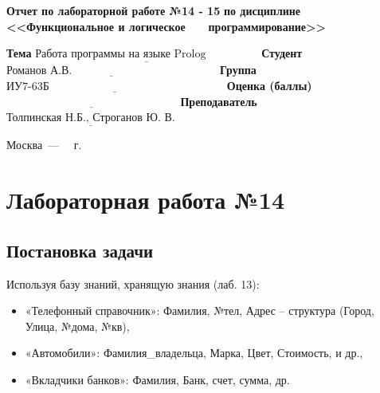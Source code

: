 \documentclass[12pt]{report}
\begin{document}
\begin{titlepage}
		\begin{center}
			\noindent\begin{minipage}{1.1\textwidth}\centering
				\Large\textbf{  Отчет по лабораторной работе №14 - 15}\newline
				\textbf{по дисциплине <<Функциональное и логическое}\newline
				\textbf{~~~программирование>>}\newline\newline
			\end{minipage}
		\end{center}
		
		\noindent\textbf{Тема} $\underline{\text{Работа программы на языке Prolog~~~~~~~~~~~~~~}}$\newline\newline
		\noindent\textbf{Студент} $\underline{\text{Романов А.В.~~~~~~~~~~~~~~~~~~~~~~~~~~~~~~~~~~~~~~~}}$\newline\newline
		\noindent\textbf{Группа} $\underline{\text{ИУ7-63Б~~~~~~~~~~~~~~~~~~~~~~~~~~~~~~~~~~~~~~~~~~~~~~~}}$\newline\newline
		\noindent\textbf{Оценка (баллы)} $\underline{\text{~~~~~~~~~~~~~~~~~~~~~~~~~~~~~~~~~~~~~~~~~~~~~~}}$\newline\newline
		\noindent\textbf{Преподаватель} $\underline{\text{Толпинская Н.Б., Строганов Ю. В.}}$\newline\newline\newline
		
		\begin{center}
			\vfill
			Москва~---~\the\year
			~г.
		\end{center}
	\end{titlepage}
	

\chapter*{Лабораторная работа №14}
\section*{Постановка задачи}

Используя  базу знаний, хранящую знания (лаб. 13):
\begin{itemize}
	\item «Телефонный справочник»: Фамилия, №тел, Адрес – структура (Город, Улица, №дома, №кв),
	\item «Автомобили»: Фамилия\_владельца, Марка, Цвет, Стоимость, и др.,
	\item «Вкладчики банков»: Фамилия, Банк, счет, сумма, др.
\end{itemize}
\end{document}
